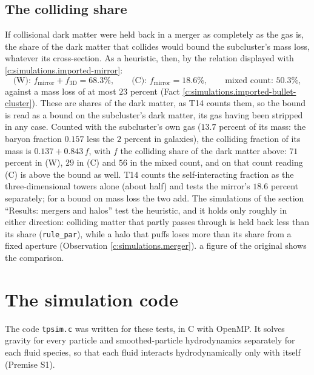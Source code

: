 \documentclass[11pt]{article}
\theoremstyle{definition}
\theoremstyle{plain}
\providecommand{\file}{}\renewcommand{\file}[1]{\texttt{#1}}
\begin{document}
\subsection*{The colliding share}
\label{c:note.simulations.setting-colliding-share}
If collisional dark matter were held back in a merger as completely as the gas is, the share of the dark matter that collides would bound the subcluster's mass loss, whatever its cross-section. As a heuristic, then, by the relation displayed with \ref{c:simulations.imported-mirror}:
\[
\text{(W): } f_{\mathrm{mirror}} + f_{3\mathrm{D}} = 68.3\%, \qquad
\text{(C): } f_{\mathrm{mirror}} = 18.6\%, \qquad
\text{mixed count: } 50.3\%,
\]
against a mass loss of at most $23$ percent (Fact \ref{c:simulations.imported-bullet-cluster}). These are shares of the dark matter, as T14 counts them, so the bound is read as a bound on the subcluster's dark matter, its gas having been stripped in any case. Counted with the subcluster's own gas ($13.7$ percent of its mass: the baryon fraction $0.157$ less the $2$ percent in galaxies), the colliding fraction of its mass is $0.137 + 0.843\,f$, with $f$ the colliding share of the dark matter above: $71$ percent in (W), $29$ in (C) and $56$ in the mixed count, and on that count reading (C) is above the bound as well. T14 \cite[Rem.~7.10, Prop.~7.15(v)]{ButlerT14} counts the self-interacting fraction as the three-dimensional towers alone (about half) and tests the mirror's $18.6$ percent separately; for a bound on mass loss the two add. The simulations of the section ``Results: mergers and halos'' test the heuristic, and it holds only roughly in either direction: colliding matter that partly passes through is held back less than its share (\texttt{rule\_par}), while a halo that puffs loses more than its share from a fixed aperture (Observation \ref{c:simulations.merger}). a figure of the original shows the comparison.

\section{The simulation code}

\label{c:note.simulations.setting-simulation-code}
The code \file{tpsim.c} \cite{ButlerSuppT14b} was written for these tests, in C with OpenMP. It solves gravity for every particle and smoothed-particle hydrodynamics separately for each fluid species, so that each fluid interacts hydrodynamically only with itself (Premise S1).
\end{document}
